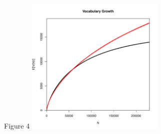 \documentclass[12pt]{report}
\newenvironment{knitrout}{}{} %
\begin{document}
Figure 4
\begin{knitrout}
\color{fgcolor}
\includegraphics[width=250,height=250]{figure/Vgc-1} 

\end{knitrout}
\end{document}
